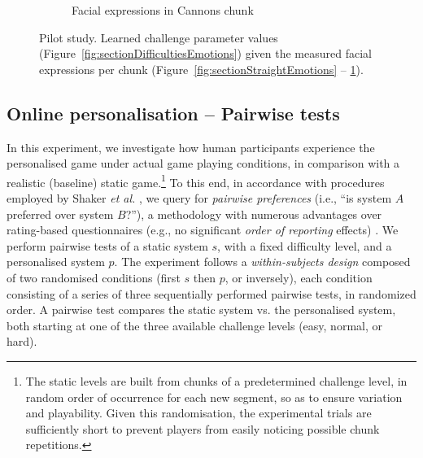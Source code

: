 \documentclass[letterpaper]{article}
\begin{document}
\begin{figure}[t]
\begin{subfigure}[t]{0.32\textwidth}
                \caption{Facial expressions in Cannons chunk}
								\label{fig:sectionCannonsEmotions}
        \end{subfigure}%
        \caption{Pilot study. Learned challenge parameter values (Figure~\ref{fig:sectionDifficultiesEmotions}) given the measured facial expressions per chunk (Figure~\ref{fig:sectionStraightEmotions} -- \ref{fig:sectionCannonsEmotions}).}
				\label{fig:emotions}
\end{figure}



\subsection{Online personalisation -- Pairwise tests}\label{exp2}

In this experiment, we investigate how human participants experience the personalised game under actual game playing conditions, in comparison with a realistic (baseline) static game.\footnote{\footnotesize{The static levels are built from chunks of a predetermined challenge level, in random order of occurrence for each new segment, so as to ensure variation and playability. Given this randomisation, the experimental trials are sufficiently short to prevent players from easily noticing possible chunk repetitions.}} To this end, in accordance with procedures employed by Shaker \emph{et al.} \citeyear{shaker2011game}, we query for \emph{pairwise preferences} (i.e., ``is system $A$ preferred over system $B$?''), a methodology with numerous advantages over rating-based questionnaires (e.g., no significant \emph{order of reporting} effects) \cite{yannakakis2011ranking}. We perform pairwise tests of a static system $s$, with a fixed difficulty level, and a personalised system $p$. The experiment follows a \emph{within-subjects design} composed of two randomised conditions (first $s$ then $p$, or inversely), each condition consisting of a series of three sequentially performed pairwise tests, in randomized order. A pairwise test compares the static system vs. the personalised system, both starting at one of the three available challenge levels (easy, normal, or hard).
\end{document}
